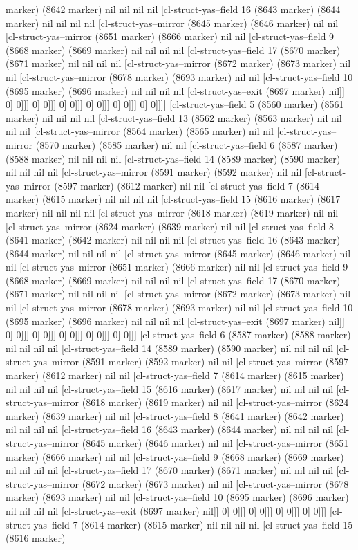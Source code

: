 {{marker) (8642 marker) nil nil nil nil [cl-struct-yas--field 16 (8643 marker) (8644 marker) nil nil nil nil [cl-struct-yas--mirror (8645 marker) (8646 marker) nil nil [cl-struct-yas--mirror (8651 marker) (8666 marker) nil nil [cl-struct-yas--field 9 (8668 marker) (8669 marker) nil nil nil nil [cl-struct-yas--field 17 (8670 marker) (8671 marker) nil nil nil nil [cl-struct-yas--mirror (8672 marker) (8673 marker) nil nil [cl-struct-yas--mirror (8678 marker) (8693 marker) nil nil [cl-struct-yas--field 10 (8695 marker) (8696 marker) nil nil nil nil [cl-struct-yas--exit (8697 marker) nil]] 0] 0]]] 0] 0]]] 0] 0]]] 0] 0]]] 0] 0]]] 0] 0]]]] [cl-struct-yas--field 5 (8560 marker) (8561 marker) nil nil nil nil [cl-struct-yas--field 13 (8562 marker) (8563 marker) nil nil nil nil [cl-struct-yas--mirror (8564 marker) (8565 marker) nil nil [cl-struct-yas--mirror (8570 marker) (8585 marker) nil nil [cl-struct-yas--field 6 (8587 marker) (8588 marker) nil nil nil nil [cl-struct-yas--field 14 (8589 marker) (8590 marker) nil nil nil nil [cl-struct-yas--mirror (8591 marker) (8592 marker) nil nil [cl-struct-yas--mirror (8597 marker) (8612 marker) nil nil [cl-struct-yas--field 7 (8614 marker) (8615 marker) nil nil nil nil [cl-struct-yas--field 15 (8616 marker) (8617 marker) nil nil nil nil [cl-struct-yas--mirror (8618 marker) (8619 marker) nil nil [cl-struct-yas--mirror (8624 marker) (8639 marker) nil nil [cl-struct-yas--field 8 (8641 marker) (8642 marker) nil nil nil nil [cl-struct-yas--field 16 (8643 marker) (8644 marker) nil nil nil nil [cl-struct-yas--mirror (8645 marker) (8646 marker) nil nil [cl-struct-yas--mirror (8651 marker) (8666 marker) nil nil [cl-struct-yas--field 9 (8668 marker) (8669 marker) nil nil nil nil [cl-struct-yas--field 17 (8670 marker) (8671 marker) nil nil nil nil [cl-struct-yas--mirror (8672 marker) (8673 marker) nil nil [cl-struct-yas--mirror (8678 marker) (8693 marker) nil nil [cl-struct-yas--field 10 (8695 marker) (8696 marker) nil nil nil nil [cl-struct-yas--exit (8697 marker) nil]] 0] 0]]] 0] 0]]] 0] 0]]] 0] 0]]] 0] 0]]] [cl-struct-yas--field 6 (8587 marker) (8588 marker) nil nil nil nil [cl-struct-yas--field 14 (8589 marker) (8590 marker) nil nil nil nil [cl-struct-yas--mirror (8591 marker) (8592 marker) nil nil [cl-struct-yas--mirror (8597 marker) (8612 marker) nil nil [cl-struct-yas--field 7 (8614 marker) (8615 marker) nil nil nil nil [cl-struct-yas--field 15 (8616 marker) (8617 marker) nil nil nil nil [cl-struct-yas--mirror (8618 marker) (8619 marker) nil nil [cl-struct-yas--mirror (8624 marker) (8639 marker) nil nil [cl-struct-yas--field 8 (8641 marker) (8642 marker) nil nil nil nil [cl-struct-yas--field 16 (8643 marker) (8644 marker) nil nil nil nil [cl-struct-yas--mirror (8645 marker) (8646 marker) nil nil [cl-struct-yas--mirror (8651 marker) (8666 marker) nil nil [cl-struct-yas--field 9 (8668 marker) (8669 marker) nil nil nil nil [cl-struct-yas--field 17 (8670 marker) (8671 marker) nil nil nil nil [cl-struct-yas--mirror (8672 marker) (8673 marker) nil nil [cl-struct-yas--mirror (8678 marker) (8693 marker) nil nil [cl-struct-yas--field 10 (8695 marker) (8696 marker) nil nil nil nil [cl-struct-yas--exit (8697 marker) nil]] 0] 0]]] 0] 0]]] 0] 0]]] 0] 0]]] [cl-struct-yas--field 7 (8614 marker) (8615 marker) nil nil nil nil [cl-struct-yas--field 15 (8616 marker) }}
